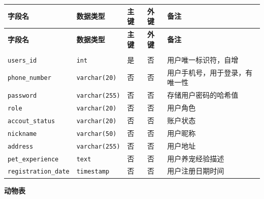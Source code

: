 \documentclass[12pt,a4paper,UTF8]{article}
\begin{document}
\begin{xltabular}{\linewidth}{|>{\raggedright\arraybackslash}p{4cm}|>{\raggedright\arraybackslash}p{3cm}|>{\raggedright\arraybackslash}p{1cm}|>{\raggedright\arraybackslash}p{1cm}|>{\raggedright\arraybackslash}p{5cm}|}
\hline
\textbf{字段名} & \textbf{数据类型} & \textbf{主键} & \textbf{外键} & \textbf{备注} \\ \hline
\endfirsthead

\hline
\textbf{字段名} & \textbf{数据类型} & \textbf{主键} & \textbf{外键} & \textbf{备注} \\ \hline
\endhead

\hline
{} \\
\endfoot

\hline 
\endlastfoot

\verb|users_id| & \verb|int| & 是 & 否 & 用户唯一标识符，自增 \\ \hline
\verb|phone_number| & \verb|varchar(20)| & 否 & 否 & 用户手机号，用于登录，有唯一性 \\ \hline
\verb|password| & \verb|varchar(255)| & 否 & 否 & 存储用户密码的哈希值 \\ \hline
\verb|role| & \verb|varchar(20)| & 否 & 否 & 用户角色 \\ \hline
\verb|accout_status| & \verb|varchar(20)| & 否 & 否 & 账户状态\\ \hline
\verb|nickname| & \verb|varchar(50)| & 否 & 否 & 用户昵称 \\ \hline
\verb|address| & \verb|varchar(255)| & 否 & 否 & 用户地址 \\ \hline
\verb|pet_experience| & \verb|text| & 否 & 否 & 用户养宠经验描述 \\ \hline
\verb|registration_date| & \verb|timestamp| & 否 & 否 & 用户注册日期时间 \\ \hline
\end{xltabular}

\vspace{0.25cm}

\noindent\textbf{动物表}
\end{document}
